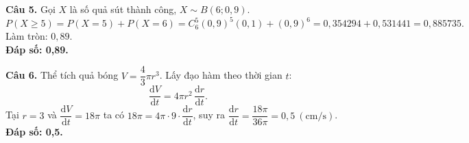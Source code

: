 \documentclass[12pt,a4paper]{article}
\begin{document}
\vspace{0.3cm}
\noindent\textbf{Câu 5.} Gọi $X$ là số quả sút thành công, $X \sim B(6; 0{,}9)$.
\[
P(X \ge 5) = P(X = 5) + P(X = 6) = C_6^5(0{,}9)^5(0{,}1) + (0{,}9)^6 = 0{,}354294 + 0{,}531441 = 0{,}885735.
\]
Làm tròn: $0{,}89$.\\
\textbf{Đáp số: 0,89.}

\vspace{0.3cm}
\noindent\textbf{Câu 6.} Thể tích quả bóng $V = \dfrac{4}{3}\pi r^3$. Lấy đạo hàm theo thời gian $t$:
\[
\dfrac{\mathrm{d}V}{\mathrm{d}t} = 4\pi r^2\,\dfrac{\mathrm{d}r}{\mathrm{d}t}.
\]
Tại $r = 3$ và $\dfrac{\mathrm{d}V}{\mathrm{d}t} = 18\pi$ ta có $18\pi = 4\pi\cdot 9\cdot \dfrac{\mathrm{d}r}{\mathrm{d}t}$, suy ra $\dfrac{\mathrm{d}r}{\mathrm{d}t} = \dfrac{18\pi}{36\pi} = 0{,}5\ (\text{cm/s})$.\\
\textbf{Đáp số: 0,5.}
\end{document}
